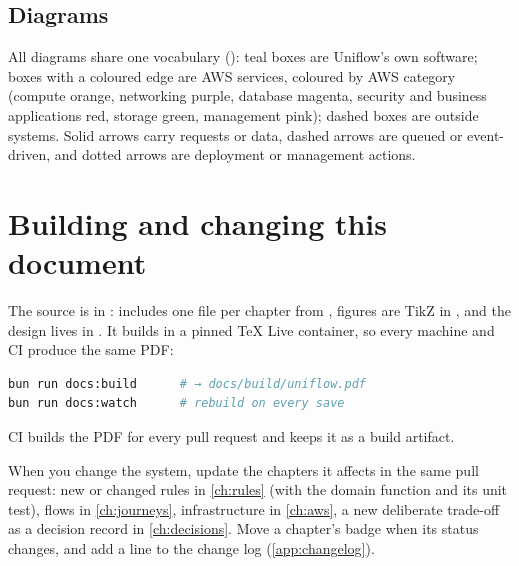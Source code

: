 \subsection{Diagrams}
All diagrams share one vocabulary (): teal boxes are Uniflow's
own software; boxes with a coloured edge are AWS services, coloured by AWS category (compute
orange, networking purple, database magenta, security and business applications red, storage green,
management pink);
dashed boxes are outside systems. Solid arrows carry requests or data, dashed arrows are queued or
event-driven, and dotted arrows are deployment or management actions.

\section{Building and changing this document}\label{sec:doc-maintenance}
The source is in :  includes one file per chapter from
, figures are TikZ in , and the design lives in
. It builds in a pinned TeX Live container, so every machine and CI produce the
same PDF:
\begin{lstlisting}[language=bash]
bun run docs:build      # → docs/build/uniflow.pdf
bun run docs:watch      # rebuild on every save
\end{lstlisting}
CI builds the PDF for every pull request and keeps it as a build artifact.

When you change the system, update the chapters it affects in the same pull request: new or
changed rules in \cref{ch:rules} (with the domain function and its unit test), flows in
\cref{ch:journeys}, infrastructure in \cref{ch:aws}, a new deliberate trade-off as a decision
record in \cref{ch:decisions}. Move a chapter's badge when its status changes, and add a line to
the change log (\cref{app:changelog}).
